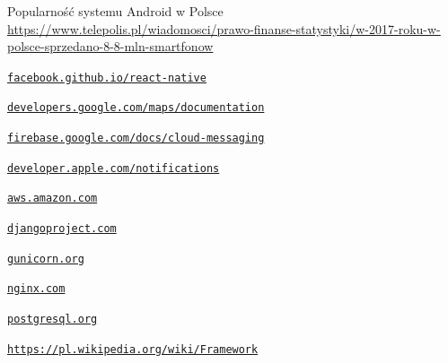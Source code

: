 \documentclass[licencjacka]{pracamgr}
\begin{document}
\begin{thebibliography}{99}
 Popularność systemu Android w Polsce\\ 
\href{https://www.telepolis.pl/wiadomosci/prawo-finanse-statystyki/w-2017-roku-w-polsce-sprzedano-8-8-mln-smartfonow}{https://www.telepolis.pl/wiadomosci/prawo-finanse-statystyki/w-2017-roku-w-polsce-sprzedano-8-8-mln-smartfonow}

 \href{https://facebook.github.io/react-native/}{\texttt{facebook.github.io/react-native}}

 \href{https://developers.google.com/maps/documentation/}{\texttt{developers.google.com/maps/documentation}}

 \href{https://firebase.google.com/docs/cloud-messaging/}{\texttt{firebase.google.com/docs/cloud-messaging}}

 \href{https://developer.apple.com/notifications/}{\texttt{developer.apple.com/notifications}}

 \href{https://aws.amazon.com/}{\texttt{aws.amazon.com}}

 \href{https://www.djangoproject.com/}{\texttt{djangoproject.com}}

 \href{https://gunicorn.org/}{\texttt{gunicorn.org}}

 \href{https://www.nginx.com/}{\texttt{nginx.com}}

 \href{https://www.postgresql.org/}{\texttt{postgresql.org}}


 \href{https://pl.wikipedia.org/wiki/Framework}{\texttt{https://pl.wikipedia.org/wiki/Framework}}

\end{thebibliography}
\end{document}
